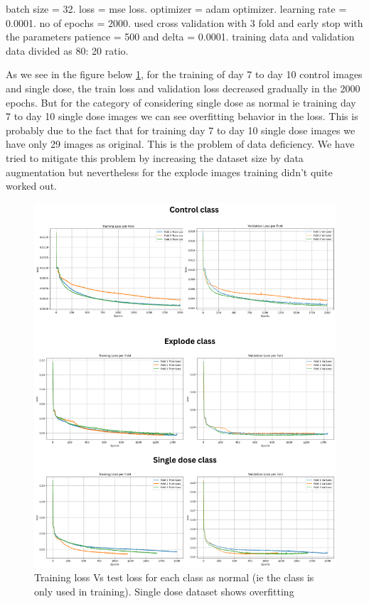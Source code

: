 batch size = 32. loss = mse loss. optimizer = adam optimizer. learning rate = 0.0001. no of epochs = 2000. used cross validation with 3 fold and  early stop with 
the parameters patience = 500 and delta = 0.0001. training data and validation data divided as 80: 20 ratio.

As we see in the figure below \ref{fig:unloss}, for the training of day 7 to day 10 control images and single dose, the train loss and validation loss decreased gradually  in the 2000 epochs. But for the category of considering single dose as normal ie training  day 7 to day 10 single dose images we can see overfitting behavior in the loss. This is probably due to the fact that for training day 7 to day 10 single dose images we have only 29 images as original. This is the problem of data deficiency. We have tried to mitigate this problem by increasing the dataset size by data augmentation but nevertheless for the explode images training didn't quite worked out.
\begin{figure}[H]
  \centering
  \includegraphics[scale=0.5]{figures/overfited.png} 
  \caption{Training loss Vs test loss for each class as normal (ie the class is only used in training). Single dose dataset shows overfitting }
  \label{fig:unloss}
\end{figure}

